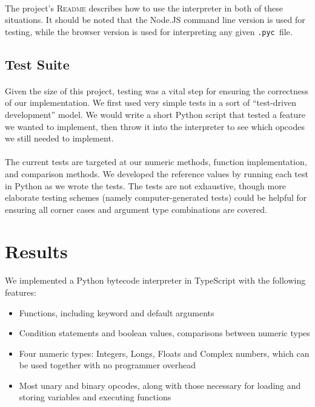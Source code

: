 \documentclass{article}
\newcommand{\pyc}{\texttt{.pyc~}}
\begin{document}
\paragraph{}
The project's \textsc{Readme} describes how to use the interpreter in both of these situations. It should be noted that the Node.JS command line version is used for testing, while the browser version is used for interpreting any given \pyc file.

\subsection{Test Suite}

\paragraph{}
Given the size of this project, testing was a vital step for ensuring the correctness of our implementation. We first used very simple tests in a sort of ``test-driven development'' model. We would write a short Python script that tested a feature we wanted to implement, then throw it into the interpreter to see which opcodes we still needed to implement.

\paragraph{}
The current tests are targeted at our numeric methods, function implementation, and comparison methods. We developed the reference values by running each test in Python as we wrote the tests. The tests are not exhaustive, though more elaborate testing schemes (namely computer-generated tests) could be helpful for ensuring all corner cases and argument type combinations are covered.

\section{Results}\label{results}

\paragraph{}
We implemented a Python bytecode interpreter in TypeScript with the following features:

\begin{itemize}
  \item Functions, including keyword and default arguments
  \item Condition statements and boolean values, comparisons between numeric types
  \item Four numeric types: Integers, Longs, Floats and Complex numbers, which can be used together with no programmer overhead
  \item Most unary and binary opcodes, along with those necessary for loading and storing variables and executing functions
\end{itemize}
\end{document}
